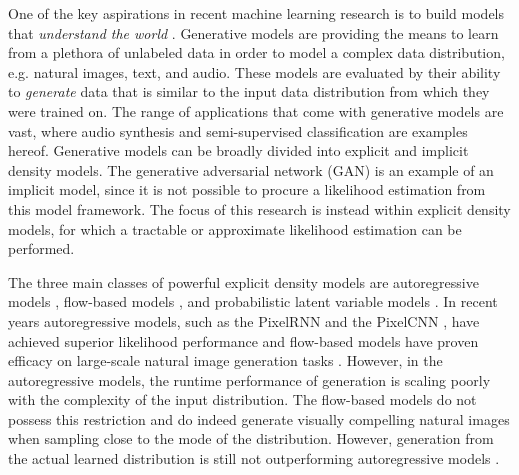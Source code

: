 \documentclass{article}
\begin{document}
\iffalse
\href{https://docs.google.com/document/d/19yo4Elt6CWX1hSRXW1L6j7ojKRx9wYpScCgWqRbC1HI/edit?usp=sharing}{Previous version}\\
\href{https://docs.google.com/document/d/1DSUVmdDB_7XuuEkPMiLuOFW9OBzplDasqXdcuwo31B8/edit?usp=sharing}{Previous version}\\
\fi
One of the key aspirations in recent machine learning research is to build models that \textit{understand the world} \citep{Kingma13, Rezende14,Goodfellow2014,Oord2015}. Generative models are providing the means to learn from a plethora of unlabeled data in order to model a complex data distribution, e.g. natural images, text, and audio. These models are evaluated by their ability to \textit{generate} data that is similar to the input data distribution from which they were trained on. The range of applications that come with generative models are vast, where audio synthesis \citep{Oord16b} and semi-supervised classification \citep{Rasmus15,Maaloe2016,Salimans2016} are examples hereof. Generative models can be broadly divided into explicit and implicit density models. The generative adversarial network (GAN) \citep{Goodfellow2014} is an example of an implicit model, since it is not possible to procure a likelihood estimation from this model framework. The focus of this research is instead within explicit density models, for which a tractable or approximate likelihood estimation can be performed.

The three main classes of powerful explicit density models are autoregressive models \citep{Larochelle11,Oord2015}, flow-based models \citep{Dinh14,Dinh16,Kingma18,Ho19}, and probabilistic latent variable models \citep{Kingma13,Rezende14,Mnih14}. In recent years autoregressive models, such as the PixelRNN and the PixelCNN \citep{Oord2015,Salimans17}, have achieved superior likelihood performance and flow-based models have proven efficacy on large-scale natural image generation tasks \citep{Kingma18}. However, in the autoregressive models, the runtime performance of generation is scaling poorly with the complexity of the input distribution. The flow-based models do not possess this restriction and do indeed generate visually compelling natural images when sampling close to the mode of the distribution. However, generation from the actual learned distribution is still not outperforming autoregressive models \citep{Kingma18, Ho19}.
\end{document}
